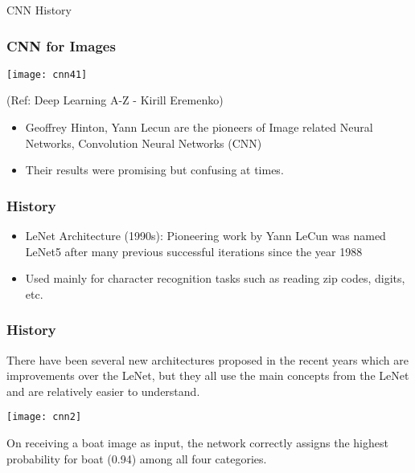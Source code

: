 \begin{frame}
  \begin{center}
    {\Large CNN History}
  \end{center}
\end{frame}



\begin{frame}[fragile] \frametitle{CNN for Images}

\begin{center}
\texttt{[image: cnn41]}

\tiny{(Ref: Deep Learning A-Z - Kirill Eremenko)}
\end{center}

\begin{itemize}
\item Geoffrey Hinton, Yann Lecun are the pioneers of Image related Neural Networks, Convolution Neural Networks (CNN)
\item Their results were promising but confusing at times.
\end{itemize}


\end{frame}

\begin{frame}[fragile] \frametitle{History}


\begin{itemize}
\item LeNet Architecture (1990s): Pioneering work by Yann LeCun was named LeNet5 after many previous successful iterations since the year 1988 
\item Used mainly for character recognition tasks such as reading zip codes, digits, etc.

\end{itemize}
\end{frame}

\begin{frame}[fragile] \frametitle{History}
There have been several new architectures proposed in the recent years which are improvements over the LeNet, but they all use the main concepts from the LeNet and are relatively easier to understand.

\begin{center}
\texttt{[image: cnn2]}
\end{center}
On receiving a boat image as input, the network correctly assigns the highest probability for boat (0.94) among all four categories. 
\end{frame}




